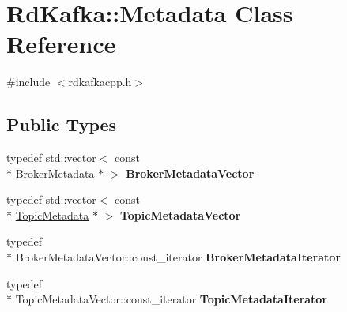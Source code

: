 \hypertarget{classRdKafka_1_1Metadata}{\section{Rd\-Kafka\-:\-:Metadata Class Reference}
\label{classRdKafka_1_1Metadata}
}


{\ttfamily \#include $<$rdkafkacpp.\-h$>$}

\subsection*{Public Types}
\begin{DoxyCompactItemize}
\item 
\hypertarget{classRdKafka_1_1Metadata_a965c9ca825ca6334df81f397b43711af}{typedef std\-::vector$<$ const \\*
\hyperlink{classRdKafka_1_1BrokerMetadata}{Broker\-Metadata} $\ast$ $>$ {\bfseries Broker\-Metadata\-Vector}}\label{classRdKafka_1_1Metadata_a965c9ca825ca6334df81f397b43711af}

\item 
\hypertarget{classRdKafka_1_1Metadata_a297b2b875e4e7a68ffc1c0b1fc03fa05}{typedef std\-::vector$<$ const \\*
\hyperlink{classRdKafka_1_1TopicMetadata}{Topic\-Metadata} $\ast$ $>$ {\bfseries Topic\-Metadata\-Vector}}\label{classRdKafka_1_1Metadata_a297b2b875e4e7a68ffc1c0b1fc03fa05}

\item 
\hypertarget{classRdKafka_1_1Metadata_af5a9a87eba1dfdbf2f0123e588b043be}{typedef \\*
Broker\-Metadata\-Vector\-::const\-\_\-iterator {\bfseries Broker\-Metadata\-Iterator}}\label{classRdKafka_1_1Metadata_af5a9a87eba1dfdbf2f0123e588b043be}

\item 
\hypertarget{classRdKafka_1_1Metadata_af8256b8595093a00eb4c930d9c3e559c}{typedef \\*
Topic\-Metadata\-Vector\-::const\-\_\-iterator {\bfseries Topic\-Metadata\-Iterator}}\label{classRdKafka_1_1Metadata_af8256b8595093a00eb4c930d9c3e559c}

\end{DoxyCompactItemize}
